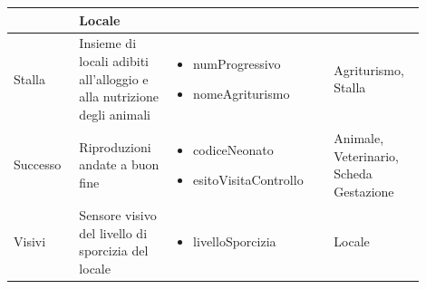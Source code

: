 \documentclass[12pt,a4paper]{article}
\begin{document}
\begin{center}
\begin{longtable}{|p{0.14\linewidth}|p{0.20\linewidth}|p{0.36\linewidth}|p{0.20\linewidth}|}
\begin{itemize}
					\end{itemize}
					&  Locale \\

\hline
Stalla 				&  Insieme di locali adibiti all'alloggio e alla nutrizione degli animali  
					& \begin{itemize}
						\setlength{\itemindent}{-1em}
						\vspace{-25pt}
						\setlength\itemsep{-0.25em}
						\item numProgressivo
						\item nomeAgriturismo
					\end{itemize} 
					&  Agriturismo, Stalla  \\

\hline
Successo				&  Riproduzioni andate a buon fine 
					& \begin{itemize}
						\setlength{\itemindent}{-1em}
						\vspace{-25pt}
						\setlength\itemsep{-0.25em}
						\item codiceNeonato
						\item esitoVisitaControllo
					\end{itemize}
					&  Animale, Veterinario, Scheda Gestazione \\

\hline
Visivi 				&  Sensore visivo del livello di sporcizia del locale  
					& \begin{itemize}
						\setlength{\itemindent}{-1em}
						\vspace{-25pt}
						\setlength\itemsep{-0.25em}
						\item livelloSporcizia
					\end{itemize}
					&  Locale \\

\hline

\end{longtable}
\end{center}
\pagebreak
\end{document}
